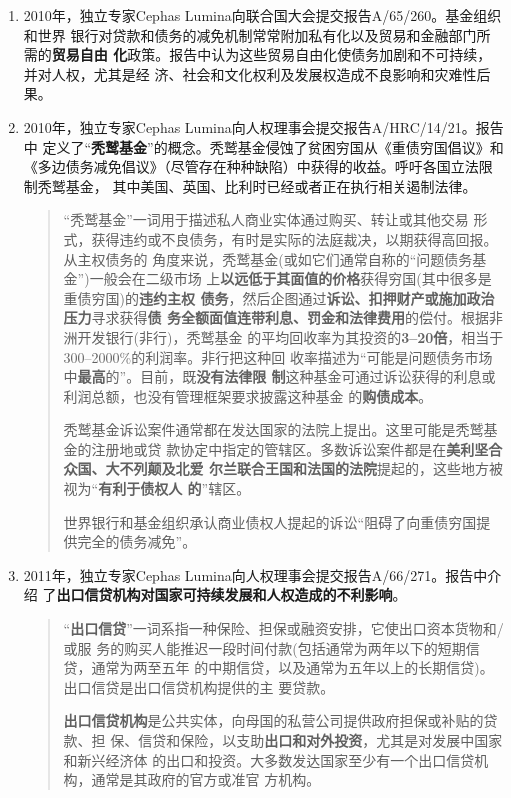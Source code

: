 \begin{enumerate}
\item 2010年，独立专家Cephas Lumina向联合国大会提交报告A/65/260。基金组织和世界
  银行对贷款和债务的减免机制常常附加私有化以及贸易和金融部门所需的\textbf{贸易自由
    化}政策。报告中认为这些贸易自由化使债务加剧和不可持续，并对人权，尤其是经
  济、社会和文化权利及发展权造成不良影响和灾难性后果。

\item 2010年，独立专家Cephas Lumina向人权理事会提交报告A/HRC/14/21。报告中
  定义了“\textbf{秃鹫基金}”的概念。秃鹫基金侵蚀了贫困穷国从《重债穷国倡议》和
  《多边债务减免倡议》（尽管存在种种缺陷）中获得的收益。呼吁各国立法限制秃鹫基金，
  其中美国、英国、比利时已经或者正在执行相关遏制法律。
  \begin{quotation}
    “秃鹫基金”一词用于描述私人商业实体通过购买、转让或其他交易
    形式，获得违约或不良债务，有时是实际的法庭裁决，以期获得高回报。从主权债务的
    角度来说，秃鹫基金(或如它们通常自称的“问题债务基金”)一般会在二级市场
    上\textbf{以远低于其面值的价格}获得穷国(其中很多是重债穷国)的\textbf{违约主权
      债务}，然后企图通过\textbf{诉讼、扣押财产或施加政治压力}寻求获得\textbf{债
      务全额面值连带利息、罚金和法律费用}的偿付。根据非洲开发银行(非行)，秃鹫基金
    的平均回收率为其投资的\textbf{3--20倍}，相当于300--2000\%的利润率。非行把这种回
    收率描述为“可能是问题债务市场中\textbf{最高}的”。目前，既\textbf{没有法律限
      制}这种基金可通过诉讼获得的利息或利润总额，也没有管理框架要求披露这种基金
    的\textbf{购债成本}。

    秃鹫基金诉讼案件通常都在发达国家的法院上提出。这里可能是秃鹫基金的注册地或贷
    款协定中指定的管辖区。多数诉讼案件都是在\textbf{美利坚合众国、大不列颠及北爱
      尔兰联合王国和法国的法院}提起的，这些地方被视为“\textbf{有利于债权人
      的}”辖区。

    世界银行和基金组织承认商业债权人提起的诉讼“阻碍了向重债穷国提供完全的债务减免”。
  \end{quotation}

\item 2011年，独立专家Cephas Lumina向人权理事会提交报告A/66/271。报告中介绍
  了\textbf{出口信贷机构对国家可持续发展和人权造成的不利影响}。

  \begin{quotation}
    “\textbf{出口信贷}”一词系指一种保险、担保或融资安排，它使出口资本货物和/或服
    务的购买人能推迟一段时间付款(包括通常为两年以下的短期信贷，通常为两至五年
    的中期信贷，以及通常为五年以上的长期信贷)。出口信贷是出口信贷机构提供的主
    要贷款。

    \textbf{出口信贷机构}是公共实体，向母国的私营公司提供政府担保或补贴的贷款、担
    保、信贷和保险，以支助\textbf{出口和对外投资}，尤其是对发展中国家和新兴经济体
    的出口和投资。大多数发达国家至少有一个出口信贷机构，通常是其政府的官方或准官
    方机构。


\end{quotation}
\end{enumerate}
